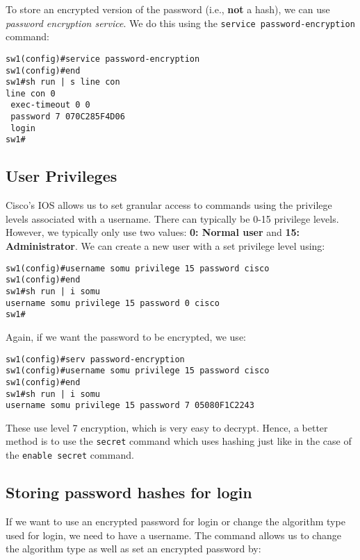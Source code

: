 \noindent
To store an encrypted version of the password (i.e., \textbf{not} a hash), we can use \textit{password encryption service}. We do this using the \verb|service password-encryption| command: 

\vspace{-15pt}
\begin{verbatim}
sw1(config)#service password-encryption
sw1(config)#end
sw1#sh run | s line con
line con 0
 exec-timeout 0 0
 password 7 070C285F4D06
 login
sw1#
\end{verbatim}
\vspace{-10pt}

\subsection{User Privileges}
Cisco's IOS allows us to set granular access to commands using the privilege levels associated with a username. There can typically be 0-15 privilege levels. However, we typically only use two values: \textbf{0: Normal user} and \textbf{15: Administrator}. We can create a new user with a set privilege level using:

\vspace{-15pt}
\begin{verbatim}
sw1(config)#username somu privilege 15 password cisco
sw1(config)#end
sw1#sh run | i somu
username somu privilege 15 password 0 cisco
sw1#
\end{verbatim}
\vspace{-10pt}

\noindent
Again, if we want the password to be encrypted, we use: 

\vspace{-15pt}
\begin{verbatim}
sw1(config)#serv password-encryption
sw1(config)#username somu privilege 15 password cisco
sw1(config)#end
sw1#sh run | i somu
username somu privilege 15 password 7 05080F1C2243
\end{verbatim}
\vspace{-10pt}

\noindent
These use level 7 encryption, which is very easy to decrypt. Hence, a better method is to use the \verb|secret| command which uses hashing just like in the case of the \verb|enable secret| command. 

\subsection{Storing password hashes for login}
If we want to use an encrypted password for login or change the algorithm type used for login, we need to have a username. The command allows us to change the algorithm type as well as set an encrypted password by: 

